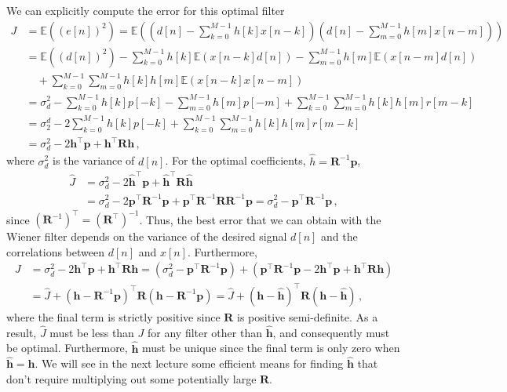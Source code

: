 We can explicitly compute the error for this optimal filter
%
\begin{align*}
  J &= \mathbb{E}\left((e[n])^2\right)
  = \mathbb{E}\left(
  \left(d[n] - \sum_{k=0}^{M-1}h[k]x[n-k]\right)
  \left(d[n] - \sum_{m=0}^{M-1}h[m]x[n-m]\right)
  \right) \\
  &= \mathbb{E}\left((d[n])^2\right)
  - \sum_{k=0}^{M-1}h[k]\mathbb{E}\left(x[n-k]d[n]\right)
  - \sum_{m=0}^{M-1}h[m]\mathbb{E}\left(x[n-m]d[n]\right) \\
  &\quad+ \sum_{k=0}^{M-1}\sum_{m=0}^{M-1} h[k]h[m]
  \mathbb{E}\left(x[n-k]x[n-m]\right) \\
  &= \sigma^2_d - \sum_{k=0}^{M-1}h[k]p[-k] - \sum_{m=0}^{M-1}h[m]p[-m]
  + \sum_{k=0}^{M-1}\sum_{m=0}^{M-1} h[k]h[m] r[m-k] \\
  &= \sigma_2^d - 2\sum_{k=0}^{M-1}h[k]p[-k]
  + \sum_{k=0}^{M-1}\sum_{m=0}^{M-1} h[k]h[m] r[m-k] \\
  &= \sigma^2_d - 2\mathbf{h}^\top\mathbf{p} + \mathbf{h}^\top\mathbf{Rh} \,,
\end{align*}
%
where $\sigma^2_d$ is the variance of $d[n]$. For the optimal coefficients,
$\hat{h} = \mathbf{R}^{-1}\mathbf{p}$,
%
\begin{align*}
  \hat{J} &= \sigma^2_d - 2\hat{\mathbf{h}}^\top\mathbf{p}
  + \hat{\mathbf{h}}^\top\mathbf{R}\hat{\mathbf{h}} \\
  &= \sigma^2_d - 2\mathbf{p}^\top\mathbf{R}^{-1}\mathbf{p}
  + \mathbf{p}^\top\mathbf{R}^{-1}\mathbf{RR}^{-1}\mathbf{p}
  = \sigma^2_d - \mathbf{p}^\top\mathbf{R}^{-1}\mathbf{p} \,,
\end{align*}
%
since $\left(\mathbf{R}^{-1}\right)^\top = \left(\mathbf{R}^\top\right)^{-1}$.
Thus, the best error that we can obtain with the Wiener filter depends on the
variance of the desired signal $d[n]$ and the correlations between
$d[n]$ and $x[n]$. Furthermore,
%
\begin{align*}
  J &= \sigma_d^2 - 2\mathbf{h}^\top\mathbf{p} + \mathbf{h}^\top\mathbf{Rh}
  = \left(\sigma_d^2 - \mathbf{p}^\top\mathbf{R}^{-1}\mathbf{p}\right)
  + \left(\mathbf{p}^\top\mathbf{R}^{-1}\mathbf{p} - 2\mathbf{h}^\top\mathbf{p}
  + \mathbf{h}^\top\mathbf{Rh}\right) \\
  &= \hat{J} + \left(\mathbf{h} - \mathbf{R}^{-1}\mathbf{p}\right)^\top\mathbf{R}
  \left(\mathbf{h} - \mathbf{R}^{-1}\mathbf{p}\right)
  = \hat{J} + \left(\mathbf{h}-\hat{\mathbf{h}}\right)^\top\mathbf{R}
  \left(\mathbf{h}-\hat{\mathbf{h}}\right) \,,
\end{align*}
%
where the final term is strictly positive since $\mathbf{R}$ is positive
semi-definite. As a result, $\hat{J}$ must be less than $J$ for any filter
other than $\hat{\mathbf{h}}$, and consequently must be optimal. Furthermore,
$\hat{\mathbf{h}}$ must be unique since the final term is only zero when
$\hat{\mathbf{h}} = \mathbf{h}$. We will see in the next lecture some
efficient means for finding $\hat{\mathbf{h}}$ that don't require multiplying out
some potentially large $\mathbf{R}$. 

